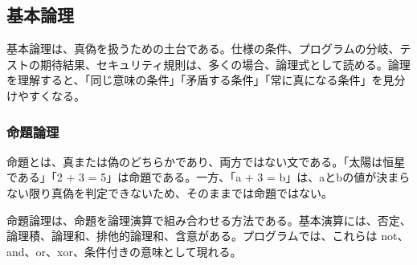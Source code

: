 \subsection{基本論理}
基本論理は、真偽を扱うための土台である。仕様の条件、プログラムの分岐、テストの期待結果、セキュリティ規則は、多くの場合、論理式として読める。論理を理解すると、「同じ意味の条件」「矛盾する条件」「常に真になる条件」を見分けやすくなる。

\subsubsection{命題論理}
命題とは、真または偽のどちらかであり、両方ではない文である。「太陽は恒星である」「2 + 3 = 5」は命題である。一方、「a + 3 = b」は、aとbの値が決まらない限り真偽を判定できないため、そのままでは命題ではない。

命題論理は、命題を論理演算で組み合わせる方法である。基本演算には、否定、論理積、論理和、排他的論理和、含意がある。プログラムでは、これらは not、and、or、xor、条件付きの意味として現れる。

